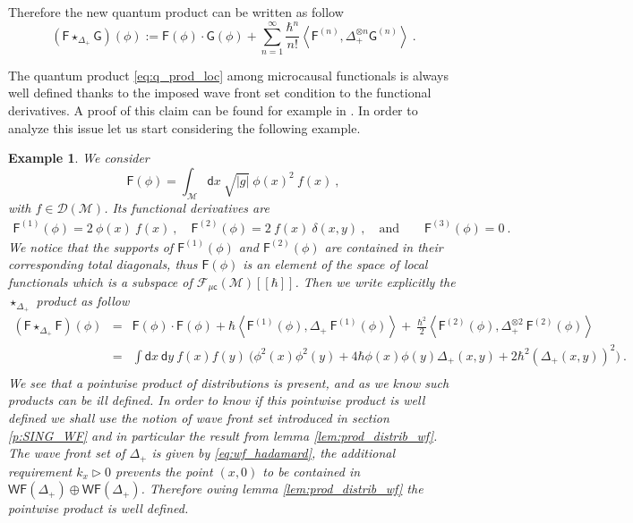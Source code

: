 \documentclass[11pt]{book}
\newcommand{\WF}{\mathsf{WF}}
\newcommand{\muc}{\mu\csf}
\newcommand{\abs}[1]{\left|#1\right|}
\newcommand{\sm}[1]{\left\langle#1\right\rangle}
\newcommand{\Dcal}{\mathcal{D}}
\newcommand{\Fcal}{\mathcal{F}}
\newcommand{\Mcal}{\mathcal{M}}
\newcommand{\Fsf}{\mathsf{F}}
\newcommand{\Gsf}{\mathsf{G}}
\newcommand{\csf}{\mathsf{c}}
\newcommand{\dsf}{\mathsf{d}}
\theoremstyle{break}
\newtheorem{example}{Example}[chapter]
\begin{document}
Therefore the new quantum product can be written as follow 
%
\begin{equation}
(\Fsf \star_{\Delta_+} \Gsf)(\phi) := \Fsf(\phi) \cdot \Gsf(\phi) + \sum_{n=1}^\infty \frac{\hbar^n}{n!} \sm{ \Fsf^{(n)} , \Delta_+^{\otimes n} \Gsf^{(n) } } \ .
\label{eq:q_prod_loc}
\end{equation}


The quantum product \eqref{eq:q_prod_loc} among microcausal functionals is always well defined thanks to the imposed wave front set condition to the functional derivatives. A proof of this claim can be found for example in \cite{hollands_renormalization_2003}. In order to analyze this issue let us start considering the following example.


\begin{example}
We consider 
%
\begin{equation}
\Fsf(\phi) = \int_\Mcal \dsf x \ \sqrt{\abs{g}} \ \phi(x)^2 \ f(x)  \ ,
\label{eq:exo_loc_obs}
\end{equation}
%
with $f \in \Dcal(\Mcal)$. Its functional derivatives are
%
\begin{eqnarray*}
\Fsf^{(1)}(\phi) = 2 \ \phi(x) \ f(x) \ , \quad \Fsf^{(2)}(\phi) = 2 \ f(x) \ \delta(x,y) \ , \quad \mbox{and} \qquad \Fsf^{(3)}(\phi) = 0 \ .
\end{eqnarray*}
%
We notice that the supports of $\Fsf^{(1)}(\phi)$ and $\Fsf^{(2)}(\phi)$ are contained in their corresponding total diagonals, thus $\Fsf(\phi)$ is an element of the space of local functionals which is a subspace of $\Fcal_{\muc}(\Mcal)[[\hbar]]$. 
%
Then we write explicitly the $\star_{\Delta_+}$ product as follow
%
\begin{eqnarray}
(\Fsf \star_{\Delta_+} \Fsf)(\phi) &=& \Fsf(\phi) \cdot \Fsf(\phi) + \hbar \sm{ \Fsf^{(1)}(\phi) , \Delta_+ \ \Fsf^{(1)}(\phi) } + \ \frac{\hbar^2}{2} \sm{ \Fsf^{(2)}(\phi) , \Delta_+^{\otimes 2} \ \Fsf^{(2)}(\phi)} \nonumber \\
%
&=& \int \dsf x \ \dsf y \ f(x) f(y) \ \bigg( \phi^2(x) \phi^2(y) + 4 \hbar \phi(x) \phi(y) \Delta_+(x,y) + 2 \hbar^2 \left(\Delta_+(x,y)\right)^2 \bigg) \ . \nonumber \\
\label{eq:exo_loc_obs_prod_q}
\end{eqnarray}
%
We see that a pointwise product of distributions is present, and as we know such products can be ill defined. In order to know if this pointwise product is well defined we shall use the notion of wave front set introduced in section \ref{p:SING_WF} and in particular the result from lemma \ref{lem:prod_distrib_wf}. The wave front set of $\Delta_+$ is given by \eqref{eq:wf_hadamard}, the additional requirement $k_x \triangleright 0$ prevents the point $(x,0)$ to be contained in $\WF(\Delta_+) \oplus \WF(\Delta_+)$. Therefore owing lemma \ref{lem:prod_distrib_wf} the pointwise product is well defined.
\end{example}
\end{document}
